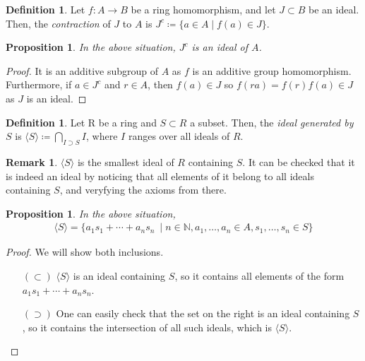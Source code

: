 \documentclass[11pt]{article}
\newtheorem{prop}[theorem]{Proposition}
\theoremstyle{definition}
\newtheorem{defn}[theorem]{Definition}
\newtheorem{rk}[theorem]{Remark}
\begin{document}
        \begin{defn}
            Let $f: A \rightarrow B$ be a ring homomorphism, and let $J \subset B$ be an ideal.
            Then, the \emph{contraction} of $J$ to $A$ is $J^{c} \coloneqq \{a \in A \mid f(a) \in J\}$.
        \end{defn}

        \begin{prop}
            In the above situation, $J^{c}$ is an ideal of $A$.
        \end{prop}

            \begin{proof}
                It is an additive subgroup of $A$ as $f$ is an additive group homomorphism.
                Furthermore, if $a \in J^{c}$ and $r \in A$, then $f(a) \in J$ so $f(ra) = f(r)f(a) \in J$ as $J$ is an ideal.
            \end{proof}

        \begin{defn}
            Let R be a ring and $S \subset R$ a subset.
            Then, the \emph{ideal generated by} $S$ is $\langle S \rangle \coloneqq \bigcap_{I \supset S} I$, where $I$ ranges over all ideals of $R$.
        \end{defn}

        \begin{rk}
            $\langle S \rangle$ is the smallest ideal of $R$ containing $S$.
            It can be checked that it is indeed an ideal by noticing that all elements of it belong to all ideals containing $S$,
            and veryfying the axioms from there.
        \end{rk}

        \begin{prop}
            In the above situation,
            \begin{align}
                \langle S \rangle = \{a_1 s_1 + \cdots + a_n s_n\ \mid n \in \mathbb{N}, a_1, \ldots, a_n \in A, s_1, \ldots, s_n \in S\} \nonumber
            \end{align}
        \end{prop}

            \begin{proof}
                We will show both inclusions.
                \begin{itemize}
                    \item[$(\subset)$] $\langle S \rangle$ is an ideal containing $S$, so it contains all elements of the form $a_1 s_1 + \cdots + a_n s_n$.
                    \item[$(\supset)$] One can easily check that the set on the right is an ideal containing $S$,
                    so it contains the intersection of all such ideals, which is $\langle S \rangle$.
                \end{itemize}
            \end{proof}
\end{document}
